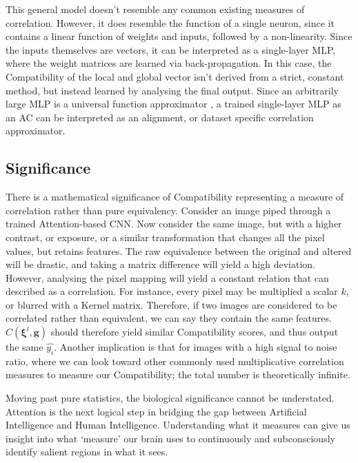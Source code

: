 \documentclass[11pt]{article}
\begin{document}
This general model doesn't resemble any common existing measures of correlation. However, it does resemble the function of a single neuron, since it contains a linear function of weights and inputs, followed by a non-linearity. Since the inputs themselves are vectors, it can be interpreted as a single-layer MLP, where the weight matrices are learned via back-propagation. In this case, the Compatibility of the local and global vector isn't derived from a strict, constant method, but instead learned by analysing the final output. Since an arbitrarily large MLP is a universal function approximator \cite{sifaoui}, a trained single-layer MLP as an AC can be interpreted as an alignment, or dataset specific correlation approximator. 

\subsection{Significance}
There is a mathematical significance of Compatibility representing a measure of correlation rather than pure equivalency. Consider an image piped through a trained Attention-based CNN. Now consider the same image, but with a higher contrast, or exposure, or a similar transformation that changes all the pixel values, but retains features. The raw equivalence between the original and altered will be drastic, and taking a matrix difference will yield a high deviation. However, analysing the pixel mapping will yield a constant relation that can described as a correlation. For instance, every pixel may be multiplied a scalar $k$, or blurred with a Kernel matrix. Therefore, if two images are considered to be correlated rather than equivalent, we can say they contain the same features. $C(\bm{\xi}^{l}, \bm{g})$ should therefore yield similar Compatibility scores, and thus output the same $\hat{y_i}$. Another implication is that for images with a high signal to noise ratio, where we can look toward other commonly used multiplicative correlation measures to measure our Compatibility; the total number is theoretically infinite. \newline

Moving past pure statistics, the biological significance cannot be understated. Attention is the next logical step in bridging the gap between Artificial Intelligence and Human Intelligence. Understanding what it measures can give us insight into what `measure' our brain uses to continuously and subconsciously identify salient regions in what it sees.
\end{document}
